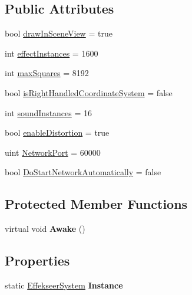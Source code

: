 \subsection*{Public Attributes}
\begin{DoxyCompactItemize}
\item 
bool \hyperlink{class_effekseer_system_a469cf59d9deeaef6e27b15c5fc5ee524}{draw\-In\-Scene\-View} = true
\item 
int \hyperlink{class_effekseer_system_a0516609db2194d83016f439b93510f21}{effect\-Instances} = 1600
\item 
int \hyperlink{class_effekseer_system_a2007e297eab6bc504cce40650679b1c4}{max\-Squares} = 8192
\item 
bool \hyperlink{class_effekseer_system_a106a9e679535bdacd968ab94c421321e}{is\-Right\-Handled\-Coordinate\-System} = false
\item 
int \hyperlink{class_effekseer_system_ac83155c54d94fc6b61f6f53032923667}{sound\-Instances} = 16
\item 
bool \hyperlink{class_effekseer_system_ad8a639d37912d6a3ada4ba5a065a7493}{enable\-Distortion} = true
\item 
uint \hyperlink{class_effekseer_system_a82dca137e7e455eb03fc07e19ec3c7c9}{Network\-Port} = 60000
\item 
bool \hyperlink{class_effekseer_system_a8fbc8f8d2b4986ad50d4e335349b0d00}{Do\-Start\-Network\-Automatically} = false
\end{DoxyCompactItemize}
\subsection*{Protected Member Functions}
\begin{DoxyCompactItemize}
\item 
\hypertarget{class_effekseer_system_a3dcfbd75d982d81fb51df0c5c39745c0}{virtual void {\bfseries Awake} ()}\label{class_effekseer_system_a3dcfbd75d982d81fb51df0c5c39745c0}

\end{DoxyCompactItemize}
\subsection*{Properties}
\begin{DoxyCompactItemize}
\item 
\hypertarget{class_effekseer_system_abaa89ed68be2a0ff10f1ab7b04ce219a}{static \hyperlink{class_effekseer_system}{Effekseer\-System} {\bfseries Instance}}\label{class_effekseer_system_abaa89ed68be2a0ff10f1ab7b04ce219a}

\end{DoxyCompactItemize}


